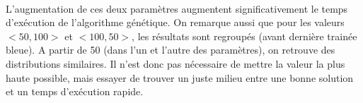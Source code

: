 \documentclass[12pt]{article}
\begin{document}
\paragraph{}L'augmentation de ces deux paramètres augmentent significativement le temps d'exécution de l'algorithme génétique. On remarque aussi que pour les valeurs $<50,100>$ et $<100,50>$, les résultats sont regroupés (avant dernière trainée bleue). A partir de 50 (dans l'un et l'autre des paramètres), on retrouve des distributions similaires. Il n'est donc pas nécessaire de mettre la valeur la plus haute possible, mais essayer de trouver un juste milieu entre une bonne solution et un temps d'exécution rapide.

\begin{figure}[!h]
\begin{floatrow}
\end{floatrow}
\end{figure}
\end{document}
